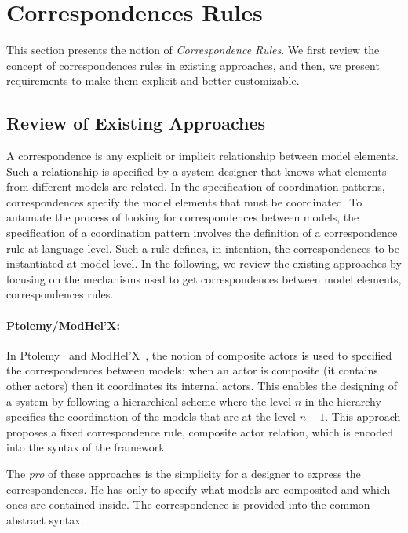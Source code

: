 \section{Correspondences Rules}
This section presents the notion of \emph{Correspondence Rules}. We first review the concept of correspondences rules in existing approaches, and then, we present requirements to make them explicit and better customizable.  

\subsection{Review of Existing Approaches}
A correspondence is any explicit or implicit relationship between model elements. Such a relationship is specified by a system designer that knows what elements from different models are related. In the specification of coordination patterns, correspondences specify the model elements that must be coordinated. To automate the process of looking for correspondences between models, the specification of a coordination pattern involves the definition of a correspondence rule at language level. Such a rule defines, in intention, the correspondences to be instantiated at model level. In the following, we review the existing approaches by focusing on the mechanisms used to get correspondences between model elements, \ie correspondences rules.       

\paragraph{Ptolemy/ModHel'X: }
In Ptolemy~\cite{ptoleframebib} and ModHel'X~\cite{modhelxbib}, the notion of composite actors is used to specified the correspondences between models: when an actor is composite (\ie it contains other actors) then it coordinates its internal actors. This enables the designing of a system by following a hierarchical scheme where the level $n$ in the hierarchy specifies the coordination of the models that are at the level $n-1$. This approach proposes a fixed correspondence rule, \ie composite actor relation, which is encoded into the syntax of the framework.

The \emph{pro} of these approaches is the simplicity for a designer to express the correspondences. He has only to specify what models are composited and which ones are contained inside. The correspondence is provided into the common abstract syntax. 

